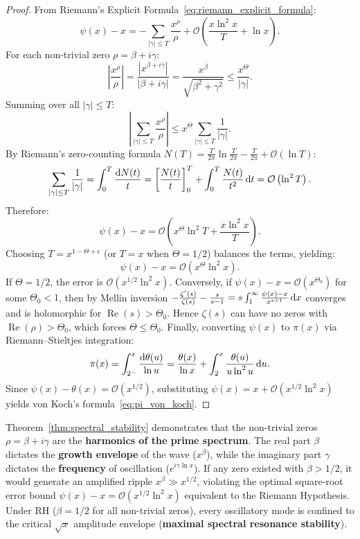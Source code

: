 \begin{proof}
\leanok
From Riemann's Explicit Formula~\eqref{eq:riemann_explicit_formula}:
$$\psi(x) - x = -\sum_{|\gamma| \le T} \frac{x^\rho}{\rho} + \mathcal{O}\left( \frac{x \ln^2 x}{T} + \ln x \right).$$
For each non-trivial zero $\rho = \beta + i \gamma$:
$$\left| \frac{x^\rho}{\rho} \right| = \frac{|x^{\beta + i \gamma}|}{|\beta + i \gamma|} = \frac{x^\beta}{\sqrt{\beta^2 + \gamma^2}} \le \frac{x^\Theta}{|\gamma|}.$$
Summing over all $|\gamma| \le T$:
$$\left| \sum_{|\gamma| \le T} \frac{x^\rho}{\rho} \right| \le x^\Theta \sum_{|\gamma| \le T} \frac{1}{|\gamma|}.$$
By Riemann's zero-counting formula $N(T) = \frac{T}{2\pi}\ln\frac{T}{2\pi} - \frac{T}{2\pi} + \mathcal{O}(\ln T)$:
$$\sum_{|\gamma| \le T} \frac{1}{|\gamma|} = \int_0^T \frac{\mathrm{d} N(t)}{t} = \left[ \frac{N(t)}{t} \right]_0^T + \int_0^T \frac{N(t)}{t^2} \, \mathrm{d} t = \mathcal{O}\left( \ln^2 T \right).$$
Therefore:
$$\psi(x) - x = \mathcal{O}\left( x^\Theta \ln^2 T + \frac{x \ln^2 x}{T} \right).$$
Choosing $T = x^{1 - \Theta + \epsilon}$ (or $T = x$ when $\Theta = 1/2$) balances the terms, yielding:
$$\psi(x) - x = \mathcal{O}\left( x^\Theta \ln^2 x \right).$$
If $\Theta = 1/2$, the error is $\mathcal{O}(x^{1/2} \ln^2 x)$.
Conversely, if $\psi(x) - x = \mathcal{O}(x^{\Theta_0})$ for some $\Theta_0 < 1$, then by Mellin inversion $-\frac{\zeta'(s)}{\zeta(s)} - \frac{s}{s-1} = s \int_1^\infty \frac{\psi(x) - x}{x^{s+1}} \, \mathrm{d} x$ converges and is holomorphic for $\operatorname{Re}(s) > \Theta_0$. Hence $\zeta(s)$ can have no zeros with $\operatorname{Re}(\rho) > \Theta_0$, which forces $\Theta \le \Theta_0$.
Finally, converting $\psi(x)$ to $\pi(x)$ via Riemann--Stieltjes integration:
$$\pi(x) = \int_{2^-}^x \frac{\mathrm{d} \theta(u)}{\ln u} = \frac{\theta(x)}{\ln x} + \int_2^x \frac{\theta(u)}{u \ln^2 u} \, \mathrm{d} u.$$
Since $\psi(x) - \theta(x) = \mathcal{O}(x^{1/2})$, substituting $\psi(x) = x + \mathcal{O}(x^{1/2}\ln^2 x)$ yields von Koch's formula~\eqref{eq:pi_von_koch}.
\end{proof}

\begin{remark}
Theorem~\ref{thm:spectral_stability} demonstrates that the non-trivial zeros $\rho = \beta + i \gamma$ are the \textbf{harmonics of the prime spectrum}. The real part $\beta$ dictates the \textbf{growth envelope} of the wave ($x^\beta$), while the imaginary part $\gamma$ dictates the \textbf{frequency} of oscillation ($e^{i \gamma \ln x}$).
If any zero existed with $\beta > 1/2$, it would generate an amplified ripple $x^\beta \gg x^{1/2}$, violating the optimal square-root error bound $\psi(x) - x = \mathcal{O}(x^{1/2}\ln^2 x)$ equivalent to the Riemann Hypothesis. Under RH ($\beta = 1/2$ for all non-trivial zeros), every oscillatory mode is confined to the critical $\sqrt{x}$ amplitude envelope (\textbf{maximal spectral resonance stability}).
\end{remark}

